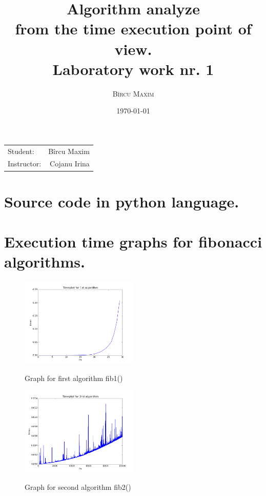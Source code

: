 \documentclass[12pt]{article}
\title{Algorithm analyze  \\ from the time execution point of view. \\ Laboratory work nr. 1} %
\author{\textsc{Bîrcu} \textsc{Maxim}} %
\date{\today} %
\begin{document}
\maketitle %

\begin{center}
\begin{tabular}{l r}

Student: & Bîrcu Maxim \\ %
Instructor: & Cojanu Irina %

\end{tabular}
\end{center}


\section{Source code in python language.}



\section{Execution time graphs for fibonacci algorithms.}

\begin{figure}[h!]
  \centering
    {%
      \includegraphics[width=0.5\textwidth]{figure_1}}
  \caption{Graph for first algorithm fib1()}
\end{figure}

\begin{figure}[h!]
  \centering
    {%
      \includegraphics[width=0.5\textwidth]{figure_2}}
  \caption{Graph for second algorithm fib2()}
\end{figure}
\end{document}
